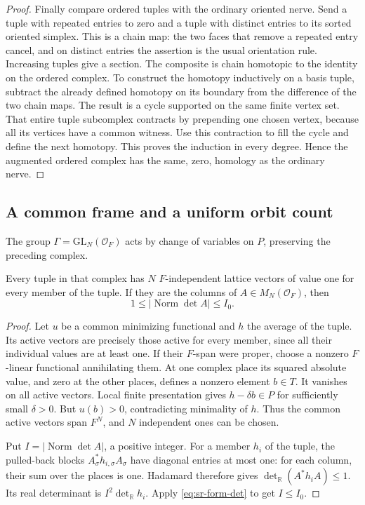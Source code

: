 \begin{proof}
Finally compare ordered tuples with the ordinary oriented nerve.
Send a tuple with repeated entries to zero and a tuple with distinct
entries to its sorted oriented simplex. This is a chain map:
the two faces that remove a repeated entry cancel, and on distinct
entries the assertion is the usual orientation rule.
Increasing tuples give a section.
The composite is chain homotopic to the identity on the ordered
complex. To construct the homotopy inductively on a basis tuple,
subtract the already defined homotopy on its boundary from the
difference of the two chain maps.
The result is a cycle supported on the same finite vertex set.
That entire tuple subcomplex contracts by prepending one chosen
vertex, because all its vertices have a common witness.
Use this contraction to fill the cycle and define the next homotopy.
This proves the induction in every degree.
Hence the augmented ordered complex has the same, zero, homology
as the ordinary nerve.
\end{proof}

\subsection{A common frame and a uniform orbit count}
The group \(\Gamma=\mathrm{GL}_N(\mathcal O_F)\) acts by change of
variables on \(P\), preserving the preceding complex.

\begin{srlemma}\label{lem:sr-common-frame}
Every tuple in that complex has \(N\) \(F\)-independent lattice
vectors of value one for every member of the tuple.
If they are the columns of \(A\in M_N(\mathcal O_F)\), then
\[
                   1\leq|\operatorname{Norm}\det A|\leq I_0.
\]
\end{srlemma}
\begin{proof}
Let \(u\) be a common minimizing functional and \(h\) the average
of the tuple. Its active vectors are precisely those active for every
member, since all their individual values are at least one.
If their \(F\)-span were proper, choose a nonzero \(F\)-linear
functional annihilating them.
At one complex place its squared absolute value, and zero at the
other places, defines a nonzero element \(b\in T\).
It vanishes on all active vectors.
Local finite presentation gives \(h-\delta b\in P\) for sufficiently
small \(\delta>0\).
But \(u(b)>0\), contradicting minimality of \(h\).
Thus the common active vectors span \(F^N\), and \(N\) independent
ones can be chosen.

Put \(I=|\operatorname{Norm}\det A|\), a positive integer.
For a member \(h_i\) of the tuple, the pulled-back blocks
\(A_\sigma^*h_{i,\sigma}A_\sigma\) have diagonal entries at most
one: for each column, their sum over the places is one.
Hadamard therefore gives
\(\det_{\mathbb R}(A^*h_iA)\leq1\).
Its real determinant is \(I^2\det_{\mathbb R}h_i\).
Apply \eqref{eq:sr-form-det} to get \(I\leq I_0\).
\end{proof}

